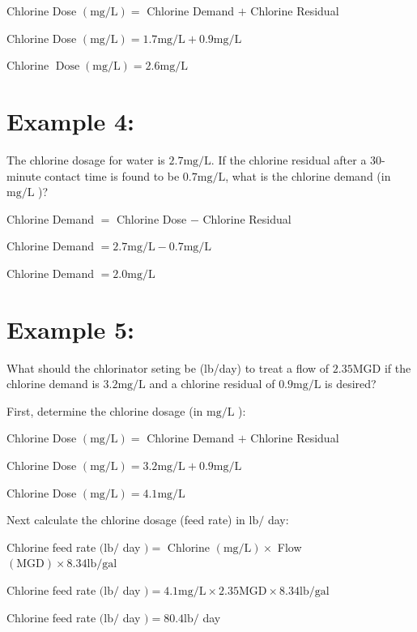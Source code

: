 \documentclass[10pt]{article}
\begin{document}
Chlorine Dose $(\mathrm{mg} / \mathrm{L})=$ Chlorine Demand $+$ Chlorine Residual

Chlorine Dose $(\mathrm{mg} / \mathrm{L})=1.7 \mathrm{mg} / \mathrm{L}+0.9 \mathrm{mg} / \mathrm{L}$

Chlorine $\operatorname{Dose}(\mathrm{mg} / \mathrm{L})=2.6 \mathrm{mg} / \mathrm{L}$

\section{Example 4:}
The chlorine dosage for water is $2.7 \mathrm{mg} / \mathrm{L}$. If the chlorine residual after a 30-minute contact time is found to be $0.7 \mathrm{mg} / \mathrm{L}$, what is the chlorine demand (in $\mathrm{mg} / \mathrm{L}$ )?

Chlorine Demand $=$ Chlorine Dose $-$ Chlorine Residual

Chlorine Demand $=2.7 \mathrm{mg} / \mathrm{L}-0.7 \mathrm{mg} / \mathrm{L}$

Chlorine Demand $=2.0 \mathrm{mg} / \mathrm{L}$

\section{Example 5:}
What should the chlorinator seting be (lb/day) to treat a flow of $2.35 \mathrm{MGD}$ if the chlorine demand is $3.2 \mathrm{mg} / \mathrm{L}$ and a chlorine residual of $0.9 \mathrm{mg} / \mathrm{L}$ is desired?

First, determine the chlorine dosage (in $\mathrm{mg} / \mathrm{L}$ ):

Chlorine Dose $(\mathrm{mg} / \mathrm{L})=$ Chlorine Demand $+$ Chlorine Residual

Chlorine Dose $(\mathrm{mg} / \mathrm{L})=3.2 \mathrm{mg} / \mathrm{L}+0.9 \mathrm{mg} / \mathrm{L}$

Chlorine Dose $(\mathrm{mg} / \mathrm{L})=4.1 \mathrm{mg} / \mathrm{L}$

Next calculate the chlorine dosage (feed rate) in $\mathrm{lb} /$ day:

Chlorine feed rate $(\mathrm{lb} /$ day $)=$ Chlorine $(\mathrm{mg} / \mathrm{L}) \times$ Flow $(\mathrm{MGD}) \times 8.34 \mathrm{lb} / \mathrm{gal}$

Chlorine feed rate $(\mathrm{lb} /$ day $)=4.1 \mathrm{mg} / \mathrm{L} \times 2.35 \mathrm{MGD} \times 8.34 \mathrm{lb} / \mathrm{gal}$

Chlorine feed rate $(\mathrm{lb} /$ day $)=80.4 \mathrm{lb} /$ day
\end{document}

